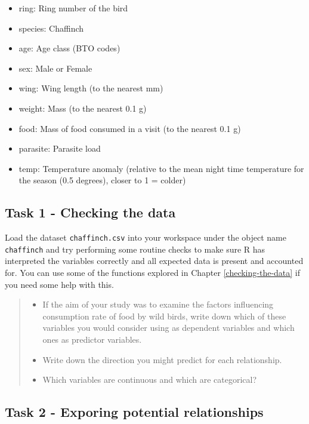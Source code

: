 \documentclass[
]{book}
\providecommand{\tightlist}{%
  \setlength{\itemsep}{0pt}\setlength{\parskip}{0pt}}
\begin{document}
\begin{itemize}
\tightlist
\item
  ring: Ring number of the bird
\item
  species: Chaffinch
\item
  age: Age class (BTO codes)
\item
  sex: Male or Female
\item
  wing: Wing length (to the nearest mm)
\item
  weight: Mass (to the nearest 0.1 g)
\item
  food: Mass of food consumed in a visit (to the nearest 0.1 g)
\item
  parasite: Parasite load
\item
  temp: Temperature anomaly (relative to the mean night time temperature for the season (0.5 degrees), closer to 1 = colder)
\end{itemize}

\hypertarget{task-1---checking-the-data-1}{%
\subsection{Task 1 - Checking the data}\label{task-1---checking-the-data-1}}

Load the dataset \texttt{chaffinch.csv} into your workspace under the object name \texttt{chaffinch} and try performing some routine checks to make sure R has interpreted the variables correctly and all expected data is present and accounted for. You can use some of the functions explored in Chapter \ref{checking-the-data} if you need some help with this.

\begin{quote}
\begin{itemize}
\tightlist
\item
  If the aim of your study was to examine the factors influencing consumption rate of food by wild birds, write down which of these variables you would consider using as dependent variables and which ones as predictor variables.
\item
  Write down the direction you might predict for each relationship.
\item
  Which variables are continuous and which are categorical?
\end{itemize}
\end{quote}

\hypertarget{task-2---exporing-potential-relationships}{%
\subsection{Task 2 - Exporing potential relationships}\label{task-2---exporing-potential-relationships}}
\end{document}

